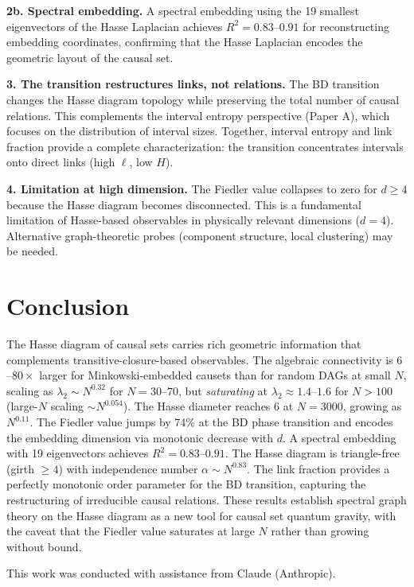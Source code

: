 \documentclass[aps,prd,twocolumn,superscriptaddress,nofootinbib]{revtex4-2}
\begin{document}
\textbf{2b. Spectral embedding.} A spectral embedding using the 19 smallest eigenvectors of the Hasse Laplacian achieves $R^2 = 0.83$--$0.91$ for reconstructing embedding coordinates, confirming that the Hasse Laplacian encodes the geometric layout of the causal set.

\textbf{3. The transition restructures links, not relations.} The BD transition changes the Hasse diagram topology while preserving the total number of causal relations. This complements the interval entropy perspective (Paper A), which focuses on the distribution of interval sizes. Together, interval entropy and link fraction provide a complete characterization: the transition concentrates intervals onto direct links (high $\ell$, low $H$).

\textbf{4. Limitation at high dimension.} The Fiedler value collapses to zero for $d \geq 4$ because the Hasse diagram becomes disconnected. This is a fundamental limitation of Hasse-based observables in physically relevant dimensions ($d = 4$). Alternative graph-theoretic probes (component structure, local clustering) may be needed.

\section{Conclusion}

The Hasse diagram of causal sets carries rich geometric information that complements transitive-closure-based observables. The algebraic connectivity is $6$--$80\times$ larger for Minkowski-embedded causets than for random DAGs at small $N$, scaling as $\lambda_2 \sim N^{0.32}$ for $N = 30$--$70$, but \emph{saturating} at $\lambda_2 \approx 1.4$--$1.6$ for $N > 100$ (large-$N$ scaling $\sim\!N^{0.054}$). The Hasse diameter reaches 6 at $N = 3000$, growing as $N^{0.11}$. The Fiedler value jumps by 74\% at the BD phase transition and encodes the embedding dimension via monotonic decrease with $d$. A spectral embedding with 19 eigenvectors achieves $R^2 = 0.83$--$0.91$. The Hasse diagram is triangle-free (girth $\geq 4$) with independence number $\alpha \sim N^{0.83}$. The link fraction provides a perfectly monotonic order parameter for the BD transition, capturing the restructuring of irreducible causal relations. These results establish spectral graph theory on the Hasse diagram as a new tool for causal set quantum gravity, with the caveat that the Fiedler value saturates at large $N$ rather than growing without bound.

\begin{acknowledgments}
This work was conducted with assistance from Claude (Anthropic).
\end{acknowledgments}
\end{document}
